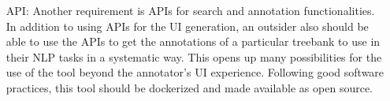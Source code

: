 \begin{itemize}[before=\normalfont, font=\itshape, align=left]
\item[API:]
Another requirement is APIs for search and annotation functionalities.
In addition to using APIs for the UI generation, an outsider also should be able to use the APIs to get the annotations of a particular treebank to use in their NLP tasks in a systematic way.
This opens up many possibilities for the use of the tool beyond the annotator's UI experience.
Following good software practices, this tool should be dockerized and made available as open source.
\end{itemize}
